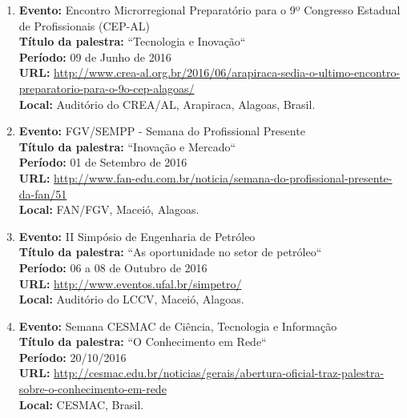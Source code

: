 \documentclass[a4paper,oneside,10pt]{article}
\begin{document}
\begin{enumerate}
 \item   \textbf{Evento:} Encontro Microrregional Preparatório para o 9º Congresso Estadual de Profissionais (CEP-AL) \mbox{} \\
         \textbf{Título da palestra:}  ``Tecnologia e Inovação``\\
        \textbf{Período:} 09 de Junho de 2016\\
        \textbf{URL:} \url{http://www.crea-al.org.br/2016/06/arapiraca-sedia-o-ultimo-encontro-preparatorio-para-o-9o-cep-alagoas/}\\
        \textbf{Local:} Auditório do CREA/AL, Arapiraca, Alagoas, Brasil.
        
 \item   \textbf{Evento:} FGV/SEMPP - Semana do Profissional Presente 
  \mbox{} \\
         \textbf{Título da palestra:}  ``Inovação e Mercado``\\
        \textbf{Período:} 01 de Setembro de 2016\\
        \textbf{URL:} \url{http://www.fan-edu.com.br/noticia/semana-do-profissional-presente-da-fan/51}\\
        \textbf{Local:} FAN/FGV, Maceió, Alagoas.        
        
 \item   \textbf{Evento:} II Simpósio de Engenharia de Petróleo
  \mbox{} \\
         \textbf{Título da palestra:}  ``As oportunidade no setor de petróleo``\\
        \textbf{Período:} 06 a 08 de Outubro de 2016\\
        \textbf{URL:} \url{http://www.eventos.ufal.br/simpetro/}\\
        \textbf{Local:} Auditório do LCCV, Maceió, Alagoas. 

\item   \textbf{Evento:}  Semana CESMAC de Ciência, Tecnologia e Informação \mbox{} \\
        \textbf{Título da palestra:} ``O Conhecimento em Rede``\\
        \textbf{Período:} 20/10/2016\\
        \textbf{URL:} \url{http://cesmac.edu.br/noticias/gerais/abertura-oficial-traz-palestra-sobre-o-conhecimento-em-rede}\\
        \textbf{Local:} CESMAC, Brasil.
     

\end{enumerate}
\end{document}
